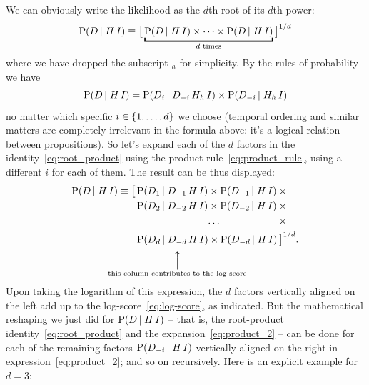\documentclass[\ifafour a4paper,12pt,\else a5paper,10pt,\fi%
onecolumn,oneside,article,%
british%
]{memoir}
\theoremstyle{remark}
\theoremstyle{innote}
\DeclarePairedDelimiter\set{\{}{\}}
\newcommand*{\p}{\mathrm{P}}%
\renewcommand*{\|}[1][]{\nonscript\,#1\vert\nonscript\;\mathopen{}}
\newcommand*{\yK}{I}
\begin{document}
We can obviously write the likelihood as the $d$th root of its $d$th power:
\begin{equation}
  \label{eq:root_product}
  \p(D \| H \, \yK) \equiv  \bigl[\,
  \underbracket{\p(D \| H \, \yK) \times \dotsm \times
  \p(D \| H \, \yK)}_{\text{$d$ times}}
  \,\bigr]^{1/d}
\end{equation}
where we have dropped the subscript ${}_{h}$ for simplicity. By the rules
of probability we have
\begin{equation}
  \label{eq:product_rule}
  \p(D \| H \, \yK) =
  \p(D_{i} \| D_{-i} \, H_{h} \, \yK) \times \p(D_{-i} \|  H_{h} \, \yK)
\end{equation}
no matter which specific $i \in \set{1, \dotsc, d}$ we choose (temporal
ordering and similar matters are completely irrelevant in the formula
above: it's a logical relation between propositions). So let's expand each
of the $d$ factors in the identity~\eqref{eq:root_product} using the
product rule~\eqref{eq:product_rule}, using a different $i$ for each of
them. The result can be thus displayed:
\begin{equation}
  \label{eq:product_2}
  \begin{aligned}
    \p(D \| H \, \yK) \equiv{}
    \bigl[\,&\p(D_{1} \| D_{-1} \, H \, \yK) \times
            \p(D_{-1} \|  H \, \yK) \times{}\\
          &\p(D_{2} \| D_{-2} \, H \, \yK) \times
            \p(D_{-2} \| H \, \yK)\times{}\\
          &\hphantom{\p(D_{2} \| D_{-2} \, H \, \yK)}
            \mathrlap{\dotso}\hphantom{{}\times  \p(D_{-2} \| H \, \yK)}\times{}\\
          &\p(D_{d} \|\underbracket[0pt][1ex]{ D_{-d} }_{\mathclap{%
              \substack{\Big\uparrow\\\text{this column contributes to the log-score}}%
}} H \, \yK) \times\p(D_{-d} \|  H \, \yK)
            \,\bigr]^{1/d}.
  \end{aligned}
\end{equation}
Upon taking the logarithm of this expression, the $d$ factors vertically
aligned on the left add up to the log-score~\eqref{eq:log-score}, as
indicated. But the mathematical reshaping we just did for
$\p(D \| H \, \yK)$ -- that is, the root-product
identity~\eqref{eq:root_product} and the expansion~\eqref{eq:product_2} --
can be done for each of the remaining factors $\p(D_{-i} \| H \, \yK)$
vertically aligned on the right in expression~\eqref{eq:product_2}; and so
on recursively. Here is an explicit example for $d=3$:
\end{document}
